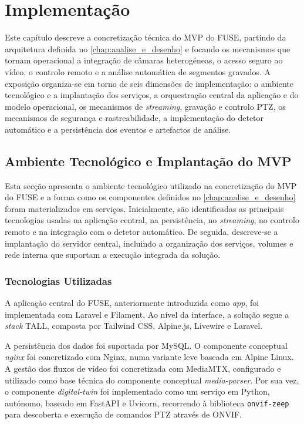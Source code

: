
\chapter{Implementação}
\label{chap:implementacao}

Este capítulo descreve a concretização técnica do \gls{MVP} do \gls{FUSE}, partindo da arquitetura definida no \autoref{chap:analise_e_desenho} e focando os mecanismos que tornam operacional a integração de câmaras heterogéneas, o acesso seguro ao vídeo, o controlo remoto e a análise automática de segmentos gravados. A exposição organiza-se em torno de seis dimensões de implementação: o ambiente tecnológico e a implantação dos serviços, a orquestração central da aplicação e do modelo operacional, os mecanismos de \textit{streaming}, gravação e controlo \gls{PTZ}, os mecanismos de segurança e rastreabilidade, a implementação do detetor automático e a persistência dos eventos e artefactos de análise.

\section{Ambiente Tecnológico e Implantação do MVP}
Esta secção apresenta o ambiente tecnológico utilizado na concretização do \gls{MVP} do \gls{FUSE} e a forma como os componentes definidos no \autoref{chap:analise_e_desenho} foram materializados em serviços. Inicialmente, são identificadas as principais tecnologias usadas na aplicação central, na persistência, no \textit{streaming}, no controlo remoto e na integração com o detetor automático. De seguida, descreve-se a implantação do servidor central, incluindo a organização dos serviços, volumes e rede interna que suportam a execução integrada da solução.

\subsection{Tecnologias Utilizadas}

A aplicação central do \gls{FUSE}, anteriormente introduzida como \textit{app}, foi implementada com Laravel e Filament. Ao nível da interface, a solução segue a \textit{stack} TALL, composta por Tailwind CSS, Alpine.js, Livewire e Laravel.

A persistência dos dados foi suportada por MySQL. O componente conceptual \textit{nginx} foi concretizado com Nginx, numa variante leve baseada em Alpine Linux. A gestão dos fluxos de vídeo foi concretizada com MediaMTX, configurado e utilizado como base técnica do componente conceptual \textit{media-parser}. Por sua vez, o componente \textit{digital-twin} foi implementado como um serviço em Python, autónomo, baseado em FastAPI e Uvicorn, recorrendo à biblioteca \texttt{onvif-zeep} para descoberta e execução de comandos \gls{PTZ} através de \gls{ONVIF}.

